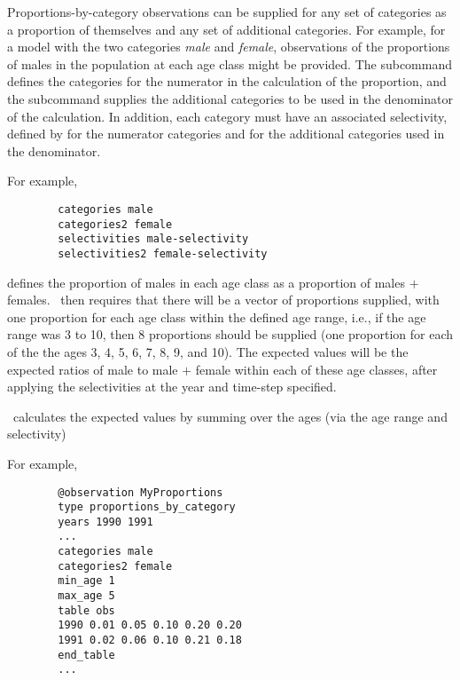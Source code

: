 Proportions-by-category observations can be supplied for any set of categories as a proportion of themselves and any set of additional categories. For example, for a model with the two categories \emph{male} and \emph{female}, observations of the proportions of males in the population at each age class might be provided. The subcommand  defines the categories for the numerator in the calculation of the proportion, and the subcommand  supplies the additional categories to be used in the denominator of the calculation. In addition, each category must have an associated selectivity, defined by  for the numerator categories and  for the additional categories used in the denominator.

For example,

{\small{\begin{verbatim}
		categories male
		categories2 female
		selectivities male-selectivity
		selectivities2 female-selectivity
		\end{verbatim}}}

defines the proportion of males in each age class as a proportion of males $+$ females. \CNAME\ then requires that there will be a vector of proportions supplied, with one proportion for each age class within the defined age range, i.e., if the age range was 3 to 10, then 8 proportions should be supplied (one proportion for each of the the ages 3, 4, 5, 6, 7, 8, 9, and 10). The expected values will be the expected ratios of male to male $+$ female within each of these age classes, after applying the selectivities at the year and time-step specified.

\CNAME\ calculates the expected values by summing over the ages (via the age range and selectivity)

For example,

{\small{\begin{verbatim}
		@observation MyProportions
		type proportions_by_category
		years 1990 1991
		...
		categories male
		categories2 female
		min_age 1
		max_age 5
		table obs
		1990 0.01 0.05 0.10 0.20 0.20
		1991 0.02 0.06 0.10 0.21 0.18
		end_table
		...
		\end{verbatim}}}

\paragraph*{\label{sec:Observation-TagRecaptureByLength}}

